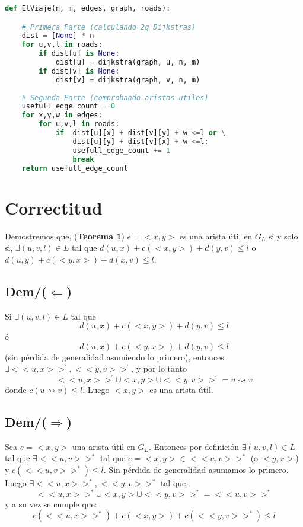 \documentclass[a4paper]{article}
\begin{document}
    \begin{lstlisting}[language=Python]
def ElViaje(n, m, edges, graph, roads):

    # Primera Parte (calculando 2q Dijkstras)
    dist = [None] * n
    for u,v,l in roads:
        if dist[u] is None:
            dist[u] = dijkstra(graph, u, n, m)
        if dist[v] is None:
            dist[v] = dijkstra(graph, v, n, m)
    
    # Segunda Parte (comprobando aristas utiles)
    usefull_edge_count = 0     
    for x,y,w in edges:
        for u,v,l in roads:
            if  dist[u][x] + dist[v][y] + w <=l or \
                dist[u][y] + dist[v][x] + w <=l:
                usefull_edge_count += 1
                break
    return usefull_edge_count
    \end{lstlisting}
    

    \section*{Correctitud}
    
    Demostremos que, (\textbf{Teorema 1}) $e = <x,y>$ es una arista útil en $G_L$ si y solo si, $\exists (u,v,l) \in L$ tal que $d(u,x) + c(<x,y>) + d(y,v) \le l$ o $d(u,y) + c(<y,x>) + d(x,v) \le l$.\\
    
    \subsection*{Dem/($\Leftarrow$)}
    
    Si $\exists (u,v,l) \in L$ tal que $$d(u,x) + c(<x,y>) + d(y,v) \le l$$ ó $$d(u,x) + c(<y,x>) + d(y,v) \le l$$ (sin pérdida de generalidad asumiendo lo primero), entonces $\exists <<u,x>>^\prime, <<y,v>>^\prime$, y por lo tanto
    $$<<u,x>>^\prime \cup <x,y> \cup <<y,v>>^\prime = u \rightsquigarrow v$$
    donde $c(u \rightsquigarrow v) \le l$. Luego $<x,y>$ es una arista útil.\\
    
    \subsection*{Dem/($\Rightarrow$)}
    
    Sea $e=<x,y>$ una arista útil en $G_L$. Entonces por definición $\exists (u,v,l) \in L$ tal que $\exists <<u,v>>^*$ tal que $e = <x,y> \in <<u,v>>^*$ (o $<y,x>$) y $c(<<u,v>>^*) \le l$. Sin pérdida de generalidad asumamos lo primero. Luego $\exists <<u,x>>^*, <<y,v>>^*$ tal que,
    $$ <<u,x>>^* \cup <x,y> \cup <<y,v>>^* = <<u,v>>^*$$
    y a su vez se cumple que:
    $$ c(<<u,x>>^*) + c(<x,y>) + c(<<y,v>>^*) \le l $$       
    
\end{document}
